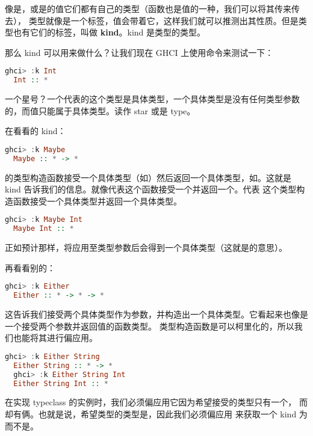 \documentclass[./main.tex]{subfiles}
\begin{document}
像是，或是的值它们都有自己的类型（函数也是值的一种，我们可以将其传来传去），
类型就像是一个标签，值会带着它，这样我们就可以推测出其性质。但是类型也有它们的标签，叫做 \textbf{kind}。kind 是类型的类型。

那么 kind 可以用来做什么？让我们现在 GHCI 上使用命令来测试一下：

\begin{lstlisting}[language=Haskell]
  ghci> :k Int
  Int :: *
\end{lstlisting}

一个星号？一个\acode{*}代表的这个类型是具体类型，一个具体类型是没有任何类型参数的，而值只能属于具体类型。\acode{*}读作
star 或是 type。

在看看的 kind：

\begin{lstlisting}[language=Haskell]
  ghci> :k Maybe
  Maybe :: * -> *
\end{lstlisting}

的类型构造函数接受一个具体类型（如）然后返回一个具体类型，如。这就是 kind
告诉我们的信息。就像代表这个函数接受一个并返回一个。\acode{* -> *}代表
这个类型构造函数接受一个具体类型并返回一个具体类型。

\begin{lstlisting}[language=Haskell]
  ghci> :k Maybe Int
  Maybe Int :: *
\end{lstlisting}

正如预计那样，将应用至类型参数后会得到一个具体类型（这就是\acode{* -> *}的意思）。

再看看别的：

\begin{lstlisting}[language=Haskell]
  ghci> :k Either
  Either :: * -> * -> *
\end{lstlisting}

这告诉我们接受两个具体类型作为参数，并构造出一个具体类型。它看起来也像是一个接受两个参数并返回值的函数类型。
类型构造函数是可以柯里化的，所以我们也能将其进行偏应用。

\begin{lstlisting}[language=Haskell]
  ghci> :k Either String
  Either String :: * -> *
  ghci> :k Either String Int
  Either String Int :: *
\end{lstlisting}

在实现 typeclass 的实例时，我们必须偏应用它因为希望接受的类型只有一个，
而却有俩。也就是说，希望类型的类型是\acode{* -> *}，因此我们必须偏应用
来获取一个 kind 为\acode{* -> *}而不是\acode{* -> * -> *}。
\end{document}
